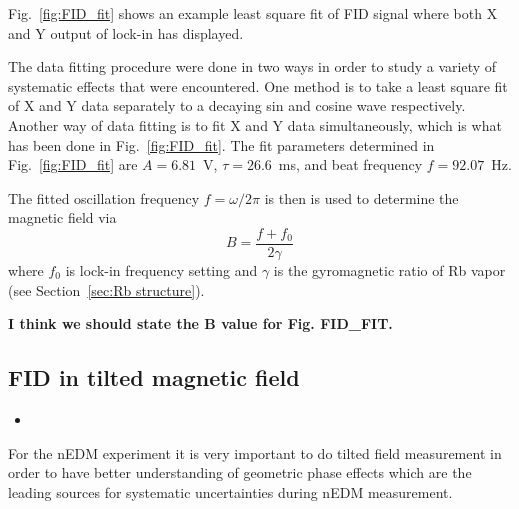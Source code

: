 Fig.~\ref{fig:FID_fit} shows an example least square fit of FID signal
where both X and Y output of lock-in has displayed.

The data fitting procedure were done in two ways in order to study a
variety of systematic effects that were encountered. One method is to
take a least square fit of X and Y data separately to a decaying sin
and cosine wave respectively.  Another way of data fitting is to fit X
and Y data simultaneously, which is what has been done in
Fig.~\ref{fig:FID_fit}.  The fit parameters determined in
Fig.~\ref{fig:FID_fit} are $A=6.81$~V, $\tau=26.6$~ms, and beat
frequency $f=92.07$~Hz.

The fitted oscillation frequency $f=\omega/2\pi$ is then is used to
determine the magnetic field via
\begin{equation}
B=\frac{f+f_0}{2\gamma}\label{eq:field}
\end{equation}
where $f_0$ is lock-in frequency setting and $\gamma$ is the
gyromagnetic ratio of Rb vapor (see Section~\ref{sec:Rb structure}).

{\bf I think we should state the B value for Fig. FID_FIT.}

 




\subsection{FID in tilted magnetic field}

\begin{itemize}
\item
\end{itemize}


For the nEDM experiment it is very important to do tilted field
measurement in order to have better understanding of geometric phase
effects which are the leading sources for systematic uncertainties
during nEDM measurement.




